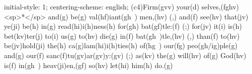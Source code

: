 initial-style: 1;
centering-scheme: english;
(c4)Firm(gvv) your(d) selves,(fghv) <sp>*</sp> and(g) be(g) val(hf)iant(gh~) men,(hv) (,) and(f) see(hv) that(jv) ye(ji) be(h) in(g) read(hi)i(h)ness(h) for(gh) bat(gf)tle:(f) (;) for(jv) it(i) is(h) bet(kv)ter(j) to(i) us(g) to(hv) die(g) in(f) bat(gh~)tle,(hv) (,) than(f) to(hv) be(jv)hold(ji) the(h) ca(g)lam(hi)i(h)ties(h) of(hg~) our(fg) peo(gh/ig)ple(g) and(g) our(f) sanc(f)tu(gv)ar(gv)y:(gv) (;) as(kv) the(g) will(hv) of(g) God(hv) is(f) in(gh~) heav(ji)en,(gf) so(hv) let(hi) him(h) do.(g)
